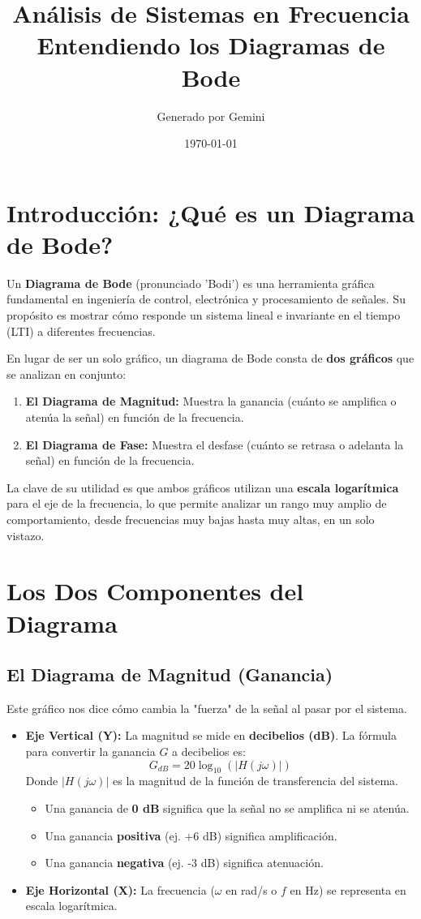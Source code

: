 \documentclass[12pt, a4paper]{article}
\title{\textbf{Análisis de Sistemas en Frecuencia}\\ \large Entendiendo los Diagramas de Bode}
\author{Generado por Gemini}
\date{\today}
\begin{document}
\maketitle
\tableofcontents
\newpage

\section{Introducción: ¿Qué es un Diagrama de Bode?}

Un \textbf{Diagrama de Bode} (pronunciado 'Bodi') es una herramienta gráfica fundamental en ingeniería de control, electrónica y procesamiento de señales. Su propósito es mostrar cómo responde un sistema lineal e invariante en el tiempo (LTI) a diferentes frecuencias.

En lugar de ser un solo gráfico, un diagrama de Bode consta de \textbf{dos gráficos} que se analizan en conjunto:
\begin{enumerate}
    \item \textbf{El Diagrama de Magnitud:} Muestra la ganancia (cuánto se amplifica o atenúa la señal) en función de la frecuencia.
    \item \textbf{El Diagrama de Fase:} Muestra el desfase (cuánto se retrasa o adelanta la señal) en función de la frecuencia.
\end{enumerate}

La clave de su utilidad es que ambos gráficos utilizan una \textbf{escala logarítmica} para el eje de la frecuencia, lo que permite analizar un rango muy amplio de comportamiento, desde frecuencias muy bajas hasta muy altas, en un solo vistazo.

\section{Los Dos Componentes del Diagrama}

\subsection{El Diagrama de Magnitud (Ganancia)}
Este gráfico nos dice cómo cambia la "fuerza" de la señal al pasar por el sistema.
\begin{itemize}
    \item \textbf{Eje Vertical (Y):} La magnitud se mide en \textbf{decibelios (dB)}. La fórmula para convertir la ganancia $G$ a decibelios es:
    $$ G_{dB} = 20 \log_{10}(|H(j\omega)|) $$
    Donde $|H(j\omega)|$ es la magnitud de la función de transferencia del sistema.
    \begin{itemize}
        \item Una ganancia de \textbf{0 dB} significa que la señal no se amplifica ni se atenúa.
        \item Una ganancia \textbf{positiva} (ej. +6 dB) significa amplificación.
        \item Una ganancia \textbf{negativa} (ej. -3 dB) significa atenuación.
    \end{itemize}
    \item \textbf{Eje Horizontal (X):} La frecuencia ($\omega$ en rad/s o $f$ en Hz) se representa en escala logarítmica.
\end{itemize}
\end{document}
